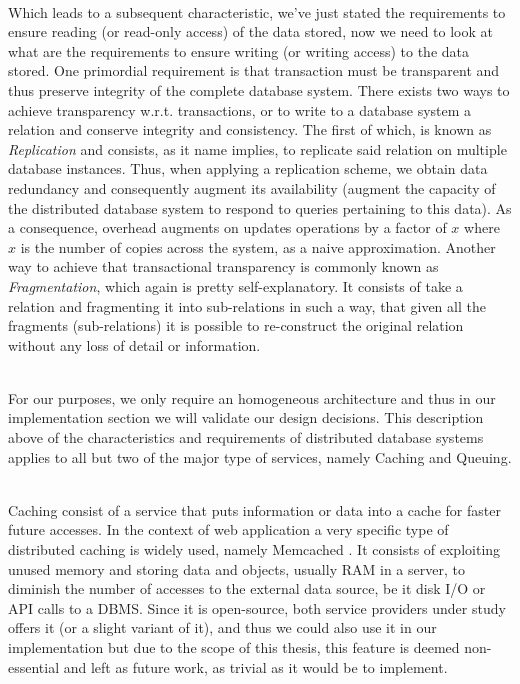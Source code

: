 \documentclass[11pt]{amsart}
\begin{document}
\begin{enumarate}
          \\ Which leads to a subsequent characteristic, we've just stated the
          requirements to ensure reading (or read-only access) of the data stored, now we
          need to look at what are the requirements to ensure writing (or writing access)
          to the data stored. One primordial requirement is that transaction must be
          transparent and thus preserve integrity of the complete database system. There
          exists two ways to achieve transparency w.r.t. transactions, or to write to a
          database system a relation and conserve integrity and consistency. The first of
          which, is known as \emph{Replication} and consists, as it name implies, to
          replicate said relation on multiple database instances. Thus, when applying a
          replication scheme, we obtain data redundancy and consequently augment its
          availability (augment the capacity of the distributed database system to respond
          to queries pertaining to this data). As a consequence, overhead augments on
          updates operations by a factor of $x$ where $x$ is the number of copies across
          the system, as a naive approximation. Another way to achieve that transactional
          transparency is commonly known as \emph{Fragmentation}, which again is pretty
          self-explanatory. It consists of take a relation and fragmenting it into
          sub-relations in such a way, that given all the fragments (sub-relations) it is
          possible to re-construct the original relation without any loss of detail or
          information. 

          \\ For our purposes, we only require an homogeneous architecture and thus in our
          implementation section we will validate our design decisions. This description
          above of the characteristics and requirements of distributed database systems
          applies to all but two of the major type of services, namely Caching and
          Queuing.
          
          \\ Caching consist of a service that puts information or data into a cache for
          faster future accesses. In the context of web application a very specific type
          of distributed caching is widely used, namely Memcached
          \cite{fitzpatrick2011memcached}. It consists of exploiting unused memory and
          storing data and objects, usually RAM in a server, to diminish the number of
          accesses to the external data source, be it disk I/O or API calls to a
          DBMS. Since it is open-source, both service providers under study offers it (or
          a slight variant of it), and thus we could also use it in our
          implementation but due to the scope of this thesis, this feature is deemed
          non-essential and left as future work, as trivial as it would be to implement. 


\end{enumarate}
\end{document}
